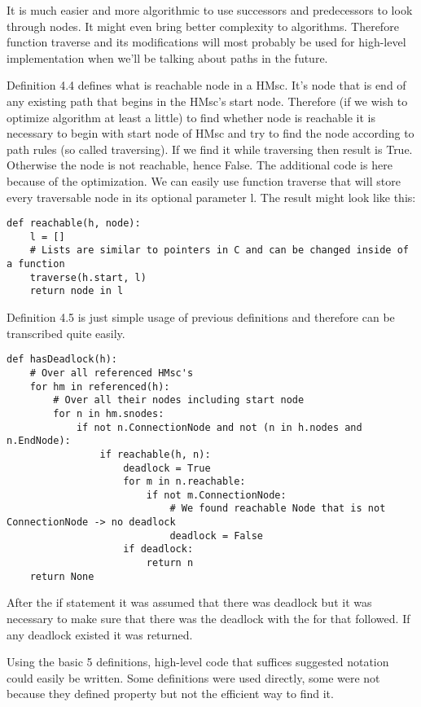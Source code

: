 \documentclass[11pt,oneside]{fithesis2}
\begin{document}
It is much easier and more algorithmic to use successors and predecessors to look through nodes. It might even bring better complexity to algorithms. Therefore function traverse and its modifications will most probably be used for high-level implementation when we'll be talking about paths in the future.

Definition 4.4 defines what is reachable node in a HMsc. It's node that is end of any existing path that begins in the HMsc's start node. Therefore (if we wish to optimize algorithm at least a little) to find whether node is reachable it is necessary to begin with start node of HMsc and try to find the node according to path rules (so called traversing). If we find it while traversing then result is True. Otherwise the node is not reachable, hence False. The additional code is here because of the optimization. We can easily use function traverse that will store every traversable node in its optional parameter l. The result might look like this:
\begin{lstlisting}
def reachable(h, node):
    l = []
    # Lists are similar to pointers in C and can be changed inside of a function
    traverse(h.start, l)
    return node in l
\end{lstlisting}
Definition 4.5 is just simple usage of previous definitions and therefore can be transcribed quite easily.
\begin{lstlisting}
def hasDeadlock(h):
    # Over all referenced HMsc's
    for hm in referenced(h):
        # Over all their nodes including start node
        for n in hm.snodes:
            if not n.ConnectionNode and not (n in h.nodes and n.EndNode):
                if reachable(h, n):
                    deadlock = True
                    for m in n.reachable:
                        if not m.ConnectionNode:
                            # We found reachable Node that is not ConnectionNode -> no deadlock
                            deadlock = False
                    if deadlock:
                        return n
    return None
\end{lstlisting}
After the if statement it was assumed that there was deadlock but it was necessary to make sure that there was the deadlock with the for that followed. If any deadlock existed it was returned.

Using the basic 5 definitions, high-level code that suffices suggested notation could easily be written. Some definitions were used directly, some were not because they defined property but not the efficient way to find it.
\end{document}
